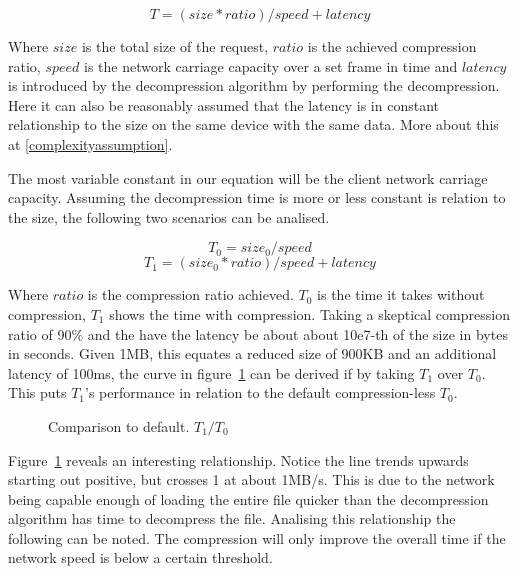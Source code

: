 \documentclass[11pt,a4paper]{report}
\begin{document}
\begin{equation}
T = (size * ratio) / speed + latency
\label{networkfun}
\end{equation}

Where $size$ is the total size of the request, $ratio$ is the achieved compression ratio, $speed$ is the network carriage capacity over a set frame in time and  $latency$ is introduced by the decompression algorithm by performing the decompression. Here it can also be reasonably assumed that the latency is in constant relationship to the size on the same device with the same data. More about this at \ref{complexityassumption}.

The most variable constant in our equation will be the client network carriage capacity. Assuming the decompression time is more or less constant is relation to the size, the following two scenarios can be analised.

\begin{equation}
T_0 = size_0 / speed
\label{networkfundefault}
\end{equation}
\begin{equation}
T_1 = (size_0 * ratio) / speed + latency
\end{equation}

Where $ratio$ is the compression ratio achieved. $T_0$ is the time it takes without compression, $T_1$ shows the time with compression. Taking a skeptical compression ratio of 90\% and the have the latency be about about 10e7-th of the size in bytes in seconds. Given 1MB, this equates a reduced size of 900KB and an additional latency of 100ms, the curve in figure~\ref{fig:CurveNetworkLimitationSpeed} can be derived if by taking $T_1$ over $T_0$. This puts $T_1$'s performance in relation to the default compression-less $T_0$.

\begin{figure}[h!]
    \centering
{}
\caption{
\label{fig:CurveNetworkLimitationSpeed} Comparison to default. $T_1 / T_0$}
\end{figure}

Figure~\ref{fig:CurveNetworkLimitationSpeed} reveals an interesting relationship. Notice the line trends upwards starting out positive, but crosses 1 at about 1MB/s. This is due to the network being capable enough of loading the entire file quicker than the decompression algorithm has time to decompress the file. Analising this relationship the following can be noted. The compression will only improve the overall time if the network speed is below a certain threshold.
\end{document}
